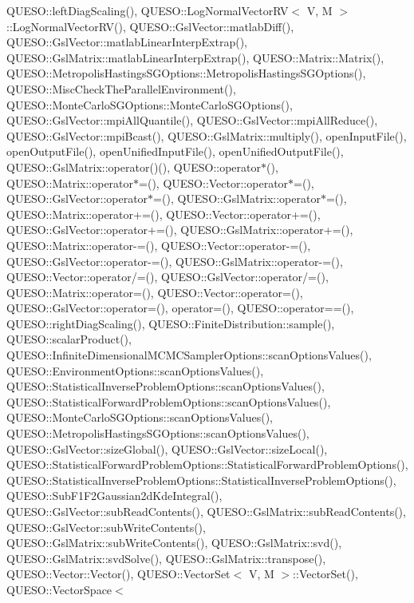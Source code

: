 Q\-U\-E\-S\-O\-::left\-Diag\-Scaling(), Q\-U\-E\-S\-O\-::\-Log\-Normal\-Vector\-R\-V$<$ V, M $>$\-::\-Log\-Normal\-Vector\-R\-V(), Q\-U\-E\-S\-O\-::\-Gsl\-Vector\-::matlab\-Diff(), Q\-U\-E\-S\-O\-::\-Gsl\-Vector\-::matlab\-Linear\-Interp\-Extrap(), Q\-U\-E\-S\-O\-::\-Gsl\-Matrix\-::matlab\-Linear\-Interp\-Extrap(), Q\-U\-E\-S\-O\-::\-Matrix\-::\-Matrix(), Q\-U\-E\-S\-O\-::\-Metropolis\-Hastings\-S\-G\-Options\-::\-Metropolis\-Hastings\-S\-G\-Options(), Q\-U\-E\-S\-O\-::\-Misc\-Check\-The\-Parallel\-Environment(), Q\-U\-E\-S\-O\-::\-Monte\-Carlo\-S\-G\-Options\-::\-Monte\-Carlo\-S\-G\-Options(), Q\-U\-E\-S\-O\-::\-Gsl\-Vector\-::mpi\-All\-Quantile(), Q\-U\-E\-S\-O\-::\-Gsl\-Vector\-::mpi\-All\-Reduce(), Q\-U\-E\-S\-O\-::\-Gsl\-Vector\-::mpi\-Bcast(), Q\-U\-E\-S\-O\-::\-Gsl\-Matrix\-::multiply(), open\-Input\-File(), open\-Output\-File(), open\-Unified\-Input\-File(), open\-Unified\-Output\-File(), Q\-U\-E\-S\-O\-::\-Gsl\-Matrix\-::operator()(), Q\-U\-E\-S\-O\-::operator$\ast$(), Q\-U\-E\-S\-O\-::\-Matrix\-::operator$\ast$=(), Q\-U\-E\-S\-O\-::\-Vector\-::operator$\ast$=(), Q\-U\-E\-S\-O\-::\-Gsl\-Vector\-::operator$\ast$=(), Q\-U\-E\-S\-O\-::\-Gsl\-Matrix\-::operator$\ast$=(), Q\-U\-E\-S\-O\-::\-Matrix\-::operator+=(), Q\-U\-E\-S\-O\-::\-Vector\-::operator+=(), Q\-U\-E\-S\-O\-::\-Gsl\-Vector\-::operator+=(), Q\-U\-E\-S\-O\-::\-Gsl\-Matrix\-::operator+=(), Q\-U\-E\-S\-O\-::\-Matrix\-::operator-\/=(), Q\-U\-E\-S\-O\-::\-Vector\-::operator-\/=(), Q\-U\-E\-S\-O\-::\-Gsl\-Vector\-::operator-\/=(), Q\-U\-E\-S\-O\-::\-Gsl\-Matrix\-::operator-\/=(), Q\-U\-E\-S\-O\-::\-Vector\-::operator/=(), Q\-U\-E\-S\-O\-::\-Gsl\-Vector\-::operator/=(), Q\-U\-E\-S\-O\-::\-Matrix\-::operator=(), Q\-U\-E\-S\-O\-::\-Vector\-::operator=(), Q\-U\-E\-S\-O\-::\-Gsl\-Vector\-::operator=(), operator=(), Q\-U\-E\-S\-O\-::operator==(), Q\-U\-E\-S\-O\-::right\-Diag\-Scaling(), Q\-U\-E\-S\-O\-::\-Finite\-Distribution\-::sample(), Q\-U\-E\-S\-O\-::scalar\-Product(), Q\-U\-E\-S\-O\-::\-Infinite\-Dimensional\-M\-C\-M\-C\-Sampler\-Options\-::scan\-Options\-Values(), Q\-U\-E\-S\-O\-::\-Environment\-Options\-::scan\-Options\-Values(), Q\-U\-E\-S\-O\-::\-Statistical\-Inverse\-Problem\-Options\-::scan\-Options\-Values(), Q\-U\-E\-S\-O\-::\-Statistical\-Forward\-Problem\-Options\-::scan\-Options\-Values(), Q\-U\-E\-S\-O\-::\-Monte\-Carlo\-S\-G\-Options\-::scan\-Options\-Values(), Q\-U\-E\-S\-O\-::\-Metropolis\-Hastings\-S\-G\-Options\-::scan\-Options\-Values(), Q\-U\-E\-S\-O\-::\-Gsl\-Vector\-::size\-Global(), Q\-U\-E\-S\-O\-::\-Gsl\-Vector\-::size\-Local(), Q\-U\-E\-S\-O\-::\-Statistical\-Forward\-Problem\-Options\-::\-Statistical\-Forward\-Problem\-Options(), Q\-U\-E\-S\-O\-::\-Statistical\-Inverse\-Problem\-Options\-::\-Statistical\-Inverse\-Problem\-Options(), Q\-U\-E\-S\-O\-::\-Sub\-F1\-F2\-Gaussian2d\-Kde\-Integral(), Q\-U\-E\-S\-O\-::\-Gsl\-Vector\-::sub\-Read\-Contents(), Q\-U\-E\-S\-O\-::\-Gsl\-Matrix\-::sub\-Read\-Contents(), Q\-U\-E\-S\-O\-::\-Gsl\-Vector\-::sub\-Write\-Contents(), Q\-U\-E\-S\-O\-::\-Gsl\-Matrix\-::sub\-Write\-Contents(), Q\-U\-E\-S\-O\-::\-Gsl\-Matrix\-::svd(), Q\-U\-E\-S\-O\-::\-Gsl\-Matrix\-::svd\-Solve(), Q\-U\-E\-S\-O\-::\-Gsl\-Matrix\-::transpose(), Q\-U\-E\-S\-O\-::\-Vector\-::\-Vector(), Q\-U\-E\-S\-O\-::\-Vector\-Set$<$ V, M $>$\-::\-Vector\-Set(), Q\-U\-E\-S\-O\-::\-Vector\-Space$<$ 